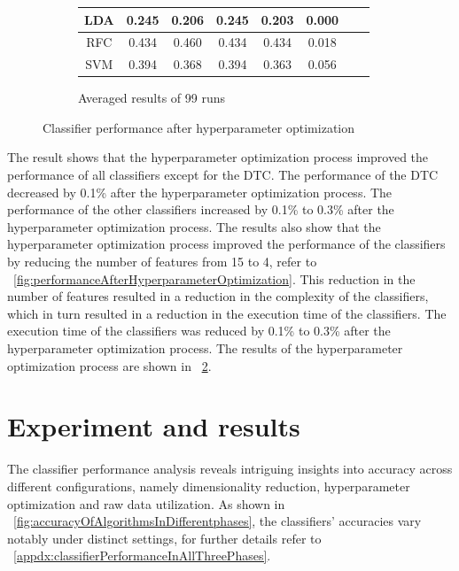 \documentclass[conference,onecolumn]{IEEEtran}
\begin{document}
\begin{figure}[H]
\begin{subfigure}{0.55\textwidth}
\begin{tabular}{|c|c|c|c|c|c|c|c|}
                        LDA    & 0.245   & 0.206   & 0.245  & 0.203   & 0.000  \\ \hline
                        RFC    & 0.434   & 0.460   & 0.434  & 0.434   & 0.018  \\ \hline
                        SVM    & 0.394   & 0.368   & 0.394  & 0.363   & 0.056  \\
                    \hline
                \end{tabular}
                \caption{Averaged results of 99 runs}
                \label{table:hyperparameterOptimizationResults}
            \end{subfigure}
            \caption{Classifier performance after hyperparameter optimization}
        \end{figure}
        
        The result shows that the hyperparameter optimization process improved the performance of all classifiers except for the DTC. The performance of the DTC decreased by 0.1\% after the hyperparameter optimization process. The performance of the other classifiers increased by 0.1\% to 0.3\% after the hyperparameter optimization process. The results also show that the hyperparameter optimization process improved the performance of the classifiers by reducing the number of features from 15 to 4, refer to \figurename~\ref{fig:performanceAfterHyperparameterOptimization}. This reduction in the number of features resulted in a reduction in the complexity of the classifiers, which in turn resulted in a reduction in the execution time of the classifiers. The execution time of the classifiers was reduced by 0.1\% to 0.3\% after the hyperparameter optimization process. The results of the hyperparameter optimization process are shown in \tablename~\ref{table:hyperparameterOptimizationResults}.
          
\section{Experiment and results}

    The classifier performance analysis reveals intriguing insights into accuracy across different configurations, namely dimensionality reduction, hyperparameter optimization and raw data utilization. As shown in \figurename~\ref{fig:accuracyOfAlgorithmsInDifferentphases}, the classifiers' accuracies vary notably under distinct settings, for further details refer to \appendixname~\ref{appdx:classifierPerformanceInAllThreePhases}.
\end{document}
